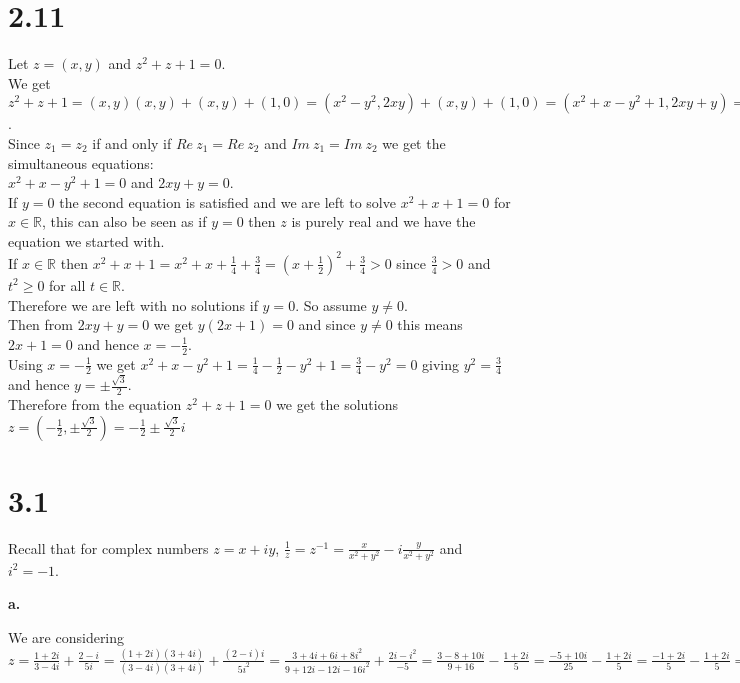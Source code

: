 \documentclass{article}
\begin{document}
\section*{2.11}
\begin{center}
    \doublespacing
    Let $z = (x, y)$ and $z^2 + z + 1 = 0$.
    \\We get $z^2 + z + 1 = (x, y)(x, y) + (x, y) + (1, 0) = (x^2 - y^2, 2xy) + (x, y) + (1, 0) = (x^2 + x - y^2 + 1, 2xy + y) = (0, 0)$.
    \\Since $z_1 = z_2$ if and only if $Re\:z_1 = Re\:z_2$ and $Im\:z_1 = Im\:z_2$ we get the simultaneous equations:
    \\$x^2 + x - y^2 + 1 = 0$ and $2xy + y = 0$.
    \\If $y = 0$ the second equation is satisfied and we are left to solve $x^2 + x + 1 = 0$ for $x\in\mathbb{R}$, this can also be seen as if $y = 0$ then $z$ is purely real and we have the equation we started with.
    \\If $x\in\mathbb{R}$ then $x^2 + x + 1 = x^2 + x +\frac{1}{4} +\frac{3}{4} = (x +\frac{1}{2})^2 +\frac{3}{4} > 0$ since $\frac{3}{4} > 0$ and $t^2\geq 0$ for all $t\in\mathbb{R}$.
    \\Therefore we are left with no solutions if $y = 0$. So assume $y\neq 0$.
    \\Then from $2xy + y = 0$ we get $y(2x + 1) = 0$ and since $y\neq 0$ this means $2x + 1 = 0$ and hence $x = -\frac{1}{2}$.
    \\Using $x = -\frac{1}{2}$ we get $x^2 + x - y^2 + 1 =\frac{1}{4} -\frac{1}{2} - y^2 + 1 =\frac{3}{4} - y^2 = 0$ giving $y^2 =\frac{3}{4}$ and hence $y =\pm\frac{\sqrt{3}}{2}$.
    \\Therefore from the equation $z^2 + z + 1 = 0$ we get the solutions $z = (-\frac{1}{2},\pm\frac{\sqrt{3}}{2}) = -\frac{1}{2}\pm\frac{\sqrt{3}}{2}i$ \qedsymbol
\end{center}


\newpage
\section*{3.1}
Recall that for complex numbers $z = x + iy$, $\frac{1}{z} = z^{-1} =\frac{x}{x^2 + y^2} - i\frac{y}{x^2 + y^2}$ and $i^2 = -1$.

{\Large\textbf{a.}}
\begin{center}
    \doublespacing
    We are considering $z =\frac{1 + 2i}{3 - 4i} +\frac{2 - i}{5i} =\frac{(1 + 2i)(3 + 4i)}{(3 - 4i)(3 + 4i)} +\frac{(2 - i)i}{5i^2} =\frac{3 + 4i + 6i + 8i^2}{9 + 12i - 12i - 16i^2} +\frac{2i - i^2}{-5} =\frac{3 - 8 + 10i}{9 + 16} -\frac{1 + 2i}{5} =\frac{-5 + 10i}{25} -\frac{1 + 2i}{5} =\frac{-1 + 2i}{5} -\frac{1 + 2i}{5} = -\frac{2}{5}$ \qedsymbol
\end{center}
\end{document}
